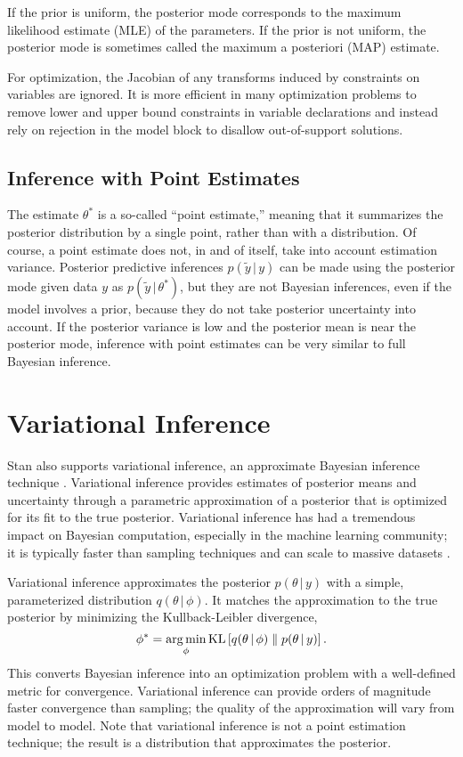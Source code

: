 If the prior is uniform, the posterior mode corresponds to the maximum
likelihood estimate (MLE) of the parameters.  If the prior is not
uniform, the posterior mode is sometimes called the maximum a
posteriori (MAP) estimate.

For optimization, the Jacobian of any transforms induced by
constraints on variables are ignored.  It is more efficient in many
optimization problems to remove lower and upper bound constraints in
variable declarations and instead rely on rejection in the model
block to disallow out-of-support solutions.


\subsection{Inference with Point Estimates}

The estimate $\theta^{*}$ is a so-called ``point estimate,'' meaning
that it summarizes the posterior distribution by a single point,
rather than with a distribution.  Of course, a point estimate does
not, in and of itself, take into account estimation variance.
Posterior predictive inferences $p(\tilde{y} \, | \, y)$ can be made using
the posterior mode given data $y$ as $p(\tilde{y} \, | \, \theta^*)$, but they
are not Bayesian inferences, even if the model involves a prior,
because they do not take posterior uncertainty into account.  If the
posterior variance is low and the posterior mean is near the posterior
mode, inference with point estimates can be very similar to full
Bayesian inference.


\section{Variational Inference}

Stan also supports variational inference, an approximate Bayesian
inference technique
\citep{Jordan:1999,Wainwright-Jordan:2008}. Variational inference
provides estimates of posterior means and uncertainty through a
parametric approximation of a posterior that is optimized for its fit
to the true posterior. Variational inference has had a tremendous
impact on Bayesian computation, especially in the machine learning
community; it is typically faster than sampling techniques and can
scale to massive datasets \citep{Hoffman:2013}.

Variational inference approximates the posterior
$p(\theta \, | \, y)$ with a simple, parameterized distribution
$q(\theta \, | \, \phi)$. It matches the approximation to the
true posterior by minimizing the Kullback-Leibler divergence,
%
\[
  \phi^* = \operatorname*{arg\,min}_\phi
  \textrm{KL}\left[ q(\theta \, | \, \phi) \;\|\; p(\theta \, | \, y) \right].
\]
%
This converts Bayesian inference into an optimization problem with a
well-defined metric for convergence. Variational inference can provide orders of
magnitude faster convergence than sampling; the quality of the approximation
will vary from model to model. Note that variational inference is not a point
estimation technique; the result is a distribution that approximates the
posterior.

